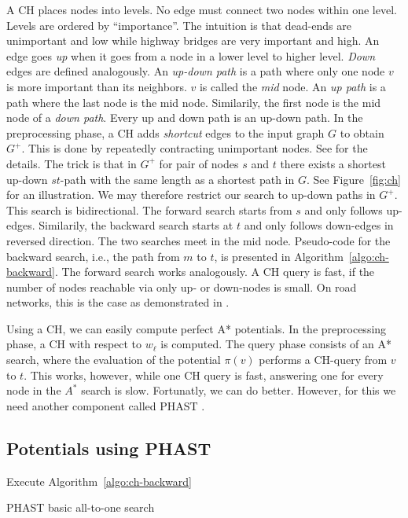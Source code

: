 \documentclass[letterpaper]{article} %
\begin{document}
A CH places nodes into levels.
No edge must connect two nodes within one level.
Levels are ordered by ``importance''.
The intuition is that dead-ends are unimportant and low while highway bridges are very important and high.
An edge goes \emph{up} when it goes from a node in a lower level to higher level.
\emph{Down} edges are defined analogously.
An \emph{up-down path} is a path where only one node $v$ is more important than its neighbors.
$v$ is called the \emph{mid} node.
An \emph{up path} is a path where the last node is the mid node.
Similarily, the first node is the mid node of a \emph{down path}.
Every up and down path is an up-down path.
%
In the preprocessing phase, a CH adds \emph{shortcut} edges to the input graph $G$ to obtain $G^+$.
This is done by repeatedly contracting unimportant nodes. 
See \cite{gssv-erlrn-12} for the details.
The trick is that in $G^+$ for pair of nodes $s$ and $t$ there exists a shortest up-down $st$-path with the same length as a shortest path in $G$.
See Figure~\ref{fig:ch} for an illustration.
We may therefore restrict our search to up-down paths in $G^+$.
This search is bidirectional.
The forward search starts from $s$ and only follows up-edges.
Similarily, the backward search starts at $t$ and only follows down-edges in reversed direction.
The two searches meet in the mid node.
Pseudo-code for the backward search, i.e., the path from $m$ to $t$, is presented in Algorithm~\ref{algo:ch-backward}.
The forward search works analogously.
%
A CH query is fast, if the number of nodes reachable via only up- or down-nodes is small.
On road networks, this is the case as demonstrated in \cite{gssv-erlrn-12,dgrw-gpnc-11,dgpw-crprn-13,dsw-cch-15,hs-gbpo-18}.

Using a CH, we can easily compute perfect A* potentials.
In the preprocessing phase, a CH with respect to $w_\ell$ is computed.
The query phase consists of an A* search, where the evaluation of the potential $\pi(v)$ performs a CH-query from $v$ to $t$.
%
This works, however, while one CH query is fast, answering one for every node in the $A^*$ search is slow.
Fortunatly, we can do better.
However, for this we need another component called PHAST \cite{dgnw-phast-13}.

\subsection{Potentials using PHAST}

\begin{algorithm2e}
Execute Algorithm~\ref{algo:ch-backward}\;
\caption{PHAST basic all-to-one search}
\label{algo:phast}
\end{algorithm2e}
\end{document}
